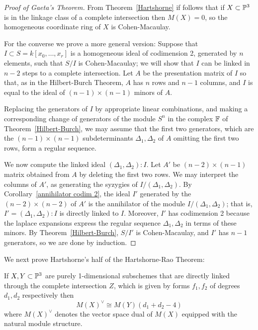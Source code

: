 \begin{proof}[Proof of Gaeta's Theorem]
From Theorem~\ref{Hartshorne} if follows that if $X\subset {\mathbb P}^3$ is in the linkage class of a complete intersection then $M(X) = 0$, so the homogeneous coordinate ring of $X$ is Cohen-Macaulay.

For the converse we prove a more general version: Suppose that $I\subset S= k[x_0,\dots,x_r]$ is a homogeneous ideal of codimension 2, generated by $n$ elements, such that $S/I$ is Cohen-Macaulay; we will show that $I$ can be linked in $n-2$ steps to a complete intersection. Let $A$ be the presentation matrix of $I$ so that, as in the Hilbert-Burch Theorem, $A$ has $n$ rows and $n-1$ columns, and $I$ is equal to the ideal of
$(n-1)\times (n-1)$ minors of $A$. 

Replacing the generators of $I$ by appropriate linear combinations, and making a corresponding change of generators of the 
module $S^n$ in the complex ${\mathbb F}$ of Theorem~\ref{Hilbert-Burch}, we may assume that the first two generators, which are the 
$(n-1)\times(n-1)$ subdeterminants $\Delta_1, \Delta_2$ of $A$ omitting the first two rows, form a regular sequence. 

We now compute the linked ideal $(\Delta_1,\Delta_2): I$. Let $A'$ be $(n-2)\times (n-1)$ matrix obtained from $A$ by
deleting the first two rows. We may interpret the columns of $A'$, as generating the syzygies
of $I/(\Delta_1, \Delta_2)$. By Corollary~\ref{annihilator codim 2}, the ideal $I'$ generated by the  $(n-2)\times(n-2)$ of $A'$ is
the annihilator of the module $I/(\Delta_1, \Delta_2)$; that is, $I' = (\Delta_1,\Delta_2): I$ is directly linked to $I$. Moreover, $I'$ has codimension 2 because
the laplace expansions express the regular sequence $\Delta_1, \Delta_2$ in terms of these minors. By Theorem~\ref{Hilbert-Burch},
$S/I'$ is Cohen-Macaulay, and $I'$ has $n-1$ generators, so we are done by induction.
\end{proof}

We next prove Hartshorne's half of the Hartshorne-Rao Theorem:

\begin{theorem} \label{Hartshorne}
If $X,Y\subset {\mathbb P}^3$ are purely 1-dimensional subschemes that are directly linked 
through the complete intersection $Z$, which is given by forms $f_1, f_2$ of degrees $d_1,d_2$ respectively
then
$$
M(X)^\vee \cong M(Y)(d_1+d_2-4)
$$
where $M(X)^\vee$ denotes the vector space dual of $M(X)$ equipped with the natural module structure.
 \end{theorem}

